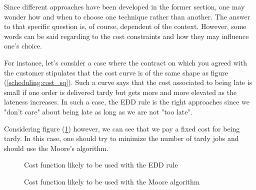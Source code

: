 Since different approaches have been developed in the former section, one may wonder how and when to choose one technique rather than another. The answer to that specific question is, of course, dependent of the context. However, some words can be said regarding to the cost constraints and how they may influence one's choice. 

For instance, let's consider a case where the contract on which you agreed with the customer stipulates that the cost curve is of the same shape as figure (\ref{scheduling:cost_sq}). Such a curve says that the cost associated to being late is small if one order is delivered tardy but gets more and more elevated as the lateness increases. In such a case, the EDD rule is the right approaches since we "don't care" about being late as long as we are not "too late". 

Considering figure (\ref{scheduling:cost_st}) however, we can see that we pay a fixed cost for being tardy. In this case, one should try to minimize the number of tardy jobs and should use the Moore's algorithm. 

\begin{figure}[h!]
    \centering
    \caption{\label{scheduling:cost_sq}Cost function likely to be used with the EDD rule}
    \caption{\label{scheduling:cost_st}Cost function likely to be used with the Moore algorithm}
\end{figure}
